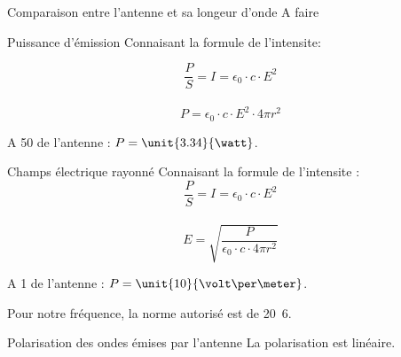 \documentclass[pdf]{beamer}
\begin{document}
\begin{frame}{Comparaison entre l'antenne et sa longeur d'onde}
	A faire
\end{frame}

\begin{frame}{Puissance d'émission}
	Connaisant la formule de l'intensite:

	$$\frac{P}{S}=I=\epsilon_0 \cdot c \cdot E^2 $$\\ 

	$$P=\epsilon_0 \cdot c \cdot E^2 \cdot 4 \pi  r^2$$
	
	\begin{center}
		A \unit{50}{\meter} de l'antenne : $P= \unit{3.34}{\watt}$.
	\end{center}
\end{frame}

\begin{frame}{Champs électrique rayonné}
	Connaisant la formule de l'intensite :
	$$\frac{P}{S}=I=\epsilon_0 \cdot c \cdot E^2 $$\\

	$$E =\sqrt{\frac{P}{\epsilon_0 \cdot c \cdot 4\pi r^2}}$$

	A \unit{1}{\meter} de l'antenne : $P= \unit{10}{\volt\per\meter}$. 

	Pour notre fréquence, la norme autorisé est de \unit{20.6}{\volt\per\meter}.
\end{frame}

\begin{frame}{Polarisation des ondes émises par l'antenne}
	La polarisation est linéaire.
\end{frame}

\begin{frame}
\end{frame}
\end{document}
